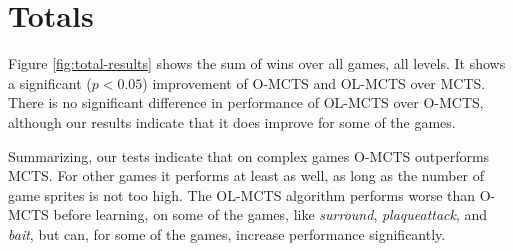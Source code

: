 \section{Totals}
\label{subsec:totals}
Figure \ref{fig:total-results} shows the sum of wins over all games, all levels.
It shows a significant ($p < 0.05$) improvement of O-MCTS and OL-MCTS over MCTS.
There is no significant difference in performance of OL-MCTS over O-MCTS,
although our results indicate that it does improve for some of the games.

Summarizing, our tests indicate that on complex games O-MCTS outperforms MCTS.
For other games it performs at least as well, as long as the number of game
sprites is not too high. 
The OL-MCTS algorithm performs worse than O-MCTS before learning, on some of the
games, like \textit{surround}, \textit{plaqueattack}, and \textit{bait}, but
can, for some of the games, increase performance significantly.
